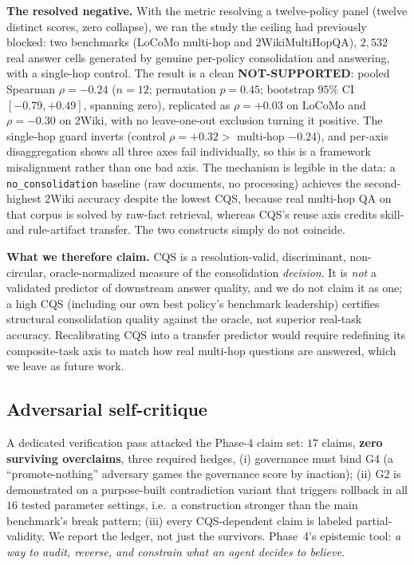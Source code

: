\documentclass[11pt]{article}
\newcommand{\cqs}{\textsc{CQS}}
\begin{document}
\textbf{The resolved negative.} With the metric resolving a twelve-policy panel (twelve
distinct scores, zero collapse), we ran the study the ceiling had previously blocked: two
benchmarks (LoCoMo multi-hop and 2WikiMultiHopQA), $2{,}532$ real answer cells generated
by genuine per-policy consolidation and answering, with a single-hop control. The result
is a clean \textbf{NOT-SUPPORTED}: pooled Spearman $\rho = -0.24$ ($n{=}12$; permutation
$p = 0.45$; bootstrap $95\%$ CI $[-0.79, +0.49]$, spanning zero), replicated as $\rho =
+0.03$ on LoCoMo and $\rho = -0.30$ on 2Wiki, with no leave-one-out exclusion turning it
positive. The single-hop guard inverts (control $\rho = +0.32 >$ multi-hop $-0.24$), and
per-axis disaggregation shows all three axes fail individually, so this is a framework
misalignment rather than one bad axis. The mechanism is legible in the data: a
\texttt{no\_consolidation} baseline (raw documents, no processing) achieves the
second-highest 2Wiki accuracy despite the lowest \cqs{}, because real multi-hop QA on
that corpus is solved by raw-fact retrieval, whereas \cqs{}'s reuse axis credits
skill- and rule-artifact transfer. The two constructs simply do not coincide.

\textbf{What we therefore claim.} \cqs{} is a resolution-valid, discriminant,
non-circular, oracle-normalized measure of the consolidation \emph{decision}. It is
\emph{not} a validated predictor of downstream answer quality, and we do not claim it as
one; a high \cqs{} (including our own best policy's benchmark leadership) certifies
structural consolidation quality against the oracle, not superior real-task accuracy.
Recalibrating \cqs{} into a transfer predictor would require redefining its composite-task
axis to match how real multi-hop questions are answered, which we leave as future work.

\subsection{Adversarial self-critique}
A dedicated verification pass attacked the Phase-4 claim set: $17$ claims, \textbf{zero
surviving overclaims}, three required hedges, (i) governance must bind G4 (a
``promote-nothing'' adversary games the governance score by inaction); (ii) G2 is
demonstrated on a purpose-built contradiction variant that triggers rollback in all
$16$ tested parameter settings, i.e.\ a construction stronger than the main
benchmark's break pattern; (iii) every \cqs{}-dependent claim is labeled
partial-validity. We report the ledger, not just the survivors. Phase~4's epistemic
tool: \emph{a way to audit, reverse, and constrain what an agent decides to believe.}
\end{document}
